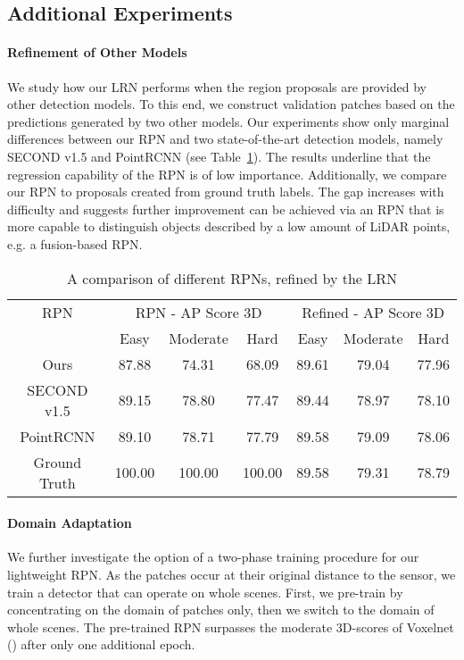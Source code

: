 \documentclass{article}
\begin{document}
\subsection{Additional Experiments}
\paragraph{Refinement of Other Models}
We study how our LRN performs when the region proposals are provided by other detection models. 
To this end, we construct validation patches based on the predictions generated by two other models.
Our experiments show only marginal differences between our RPN and two state-of-the-art detection models, namely SECOND v1.5 and 
PointRCNN (see Table~\ref{tab:different_RPNs}). The results underline that the regression capability of the RPN is of low importance.
Additionally, we compare our RPN to proposals created from ground truth labels. The gap increases with difficulty and suggests further improvement can be achieved via an RPN that is more capable to distinguish objects described by a low amount of LiDAR points, e.g. a fusion-based RPN.
\begin{table}
\begin{center}

 \begin{tabular}{c||ccc|ccc}
 	\hline
 	{RPN} &  			
	\multicolumn{3}{c|}{RPN - AP Score 3D} & \multicolumn{3}{c}{Refined - AP Score 3D} \\
 	&Easy & Moderate & Hard & Easy & Moderate & Hard\\
 	\hline\hline
 	Ours & 87.88 & 74.31 & 68.09 & 89.61 & 79.04 & 77.96 \\
 	SECOND v1.5 & 89.15 & 78.80 & 77.47 &  89.44 & 78.97 & 78.10 \\
 	PointRCNN & 89.10 & 78.71 & 77.79 &  89.58 & 79.09 & 78.06  \\
 	\hline
 	Ground Truth & 100.00 & 100.00 & 100.00 & 89.58 & 79.31 & 78.79\\
\end{tabular}
\end{center}
\caption{A comparison of different RPNs, refined by the LRN}
\label{tab:different_RPNs}
\end{table}

\paragraph{Domain Adaptation} 
We further investigate the option of a two-phase training procedure for our lightweight RPN.  As the patches occur at their original distance to the sensor, we train a detector that can operate on whole scenes. First, we pre-train by concentrating on the domain of patches only, then we switch to the domain of whole scenes. The pre-trained RPN surpasses the moderate 3D-scores of Voxelnet () after only one additional epoch.
\end{document}
